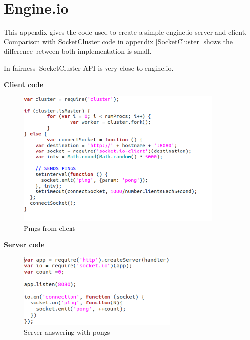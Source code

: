 
\chapter{Engine.io}
\label{engine}

This appendix gives the code used to create a simple engine.io server and
client. Comparison with SocketCluster code in appendix \ref{SocketCluster} 
shows the difference between both implementation is small. 

In fairness, SocketCluster API is very close to engine.io.

\textbf{Client code}

\begin{figure}[H]
	\centering
		\includegraphics[width=0.9\textwidth]{./Figures/engine_client_simplePong.png}
	\caption[Engine.io client code]{Pings from client}
	\label{fig:engine_client_simplePing}
\end{figure}

\newpage

\textbf{Server code}


\begin{figure}[H]
	\centering
    \includegraphics[width=0.7\textwidth]{./Figures/engine_server_simplePing.png}
	\caption[Engine.io server code]{Server answering with pongs}
	\label{fig:engine_server_simplePong}
\end{figure}


